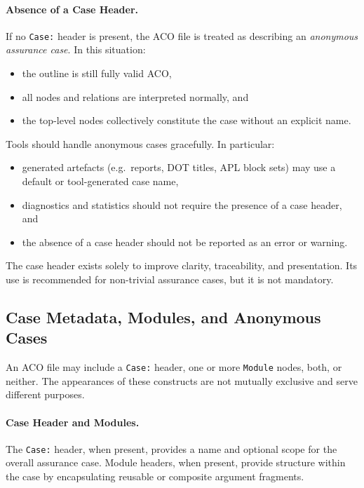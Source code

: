 \documentclass[11pt,twoside,a4paper]{article}
\begin{document}
\paragraph{Absence of a Case Header.}
If no \texttt{Case:} header is present, the ACO file is treated as describing an
\emph{anonymous assurance case}. In this situation:
\begin{itemize}[leftmargin=2em]
  \item the outline is still fully valid ACO,
  \item all nodes and relations are interpreted normally, and
  \item the top-level nodes collectively constitute the case without an explicit name.
\end{itemize}

Tools should handle anonymous cases gracefully. In particular:
\begin{itemize}[leftmargin=2em]
  \item generated artefacts (e.g.\ reports, DOT titles, APL block sets) may use
        a default or tool-generated case name,
  \item diagnostics and statistics should not require the presence of a case header, and
  \item the absence of a case header should not be reported as an error or warning.
\end{itemize}

The case header exists solely to improve clarity, traceability, and presentation.
Its use is recommended for non-trivial assurance cases, but it is not mandatory.

\subsection{Case Metadata, Modules, and Anonymous Cases}

An ACO file may include a \texttt{Case:} header, one or more \texttt{Module} nodes, both, or neither.
The appearances of these constructs are not mutually exclusive and serve different purposes.

\paragraph{Case Header and Modules.}
The \texttt{Case:} header, when present, provides a name and optional scope for the overall
assurance case. Module headers, when present, provide structure within the case by encapsulating
reusable or composite argument fragments.
\end{document}
